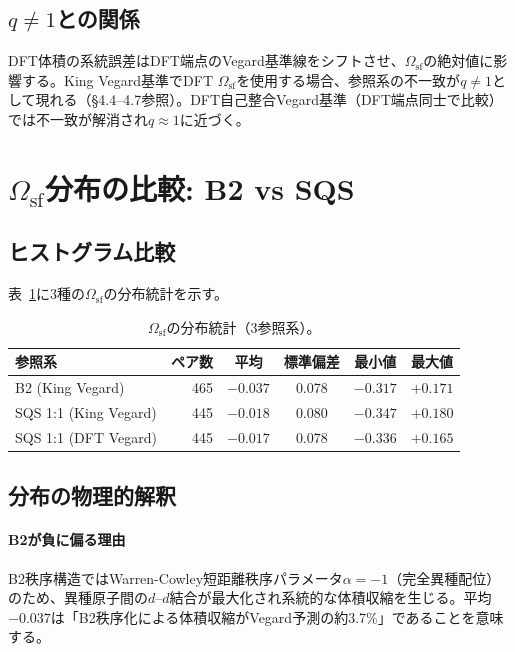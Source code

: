 \documentclass[5p,10pt]{elsarticle}
\begin{document}
\subsection{$q \neq 1$との関係}

DFT体積の系統誤差はDFT端点のVegard基準線をシフトさせ、$\Omega_\text{sf}$の絶対値に影響する。King Vegard基準でDFT $\Omega_\text{sf}$を使用する場合、参照系の不一致が$q \neq 1$として現れる（§4.4--4.7参照）。DFT自己整合Vegard基準（DFT端点同士で比較）では不一致が解消され$q \approx 1$に近づく。


\section{$\Omega_\text{sf}$分布の比較: B2 vs SQS}
\label{sec:appendix_omega_dist}

\subsection{ヒストグラム比較}

表~\ref{tab:omega_stats}に3種の$\Omega_\text{sf}$の分布統計を示す。

\begin{table}[H]
\centering
\caption{$\Omega_\text{sf}$の分布統計（3参照系）。}
\label{tab:omega_stats}
\footnotesize
\begin{tabular}{@{}lrcccc@{}}
\toprule
参照系 & ペア数 & 平均 & 標準偏差 & 最小値 & 最大値 \\
\midrule
B2 (King Vegard) & 465 & $-0.037$ & 0.078 & $-0.317$ & $+0.171$ \\
SQS 1:1 (King Vegard) & 445 & $-0.018$ & 0.080 & $-0.347$ & $+0.180$ \\
SQS 1:1 (DFT Vegard) & 445 & $-0.017$ & 0.078 & $-0.336$ & $+0.165$ \\
\bottomrule
\end{tabular}
\end{table}

\subsection{分布の物理的解釈}

\paragraph{B2が負に偏る理由}
B2秩序構造ではWarren-Cowley短距離秩序パラメータ$\alpha = -1$（完全異種配位）のため、異種原子間の$d$--$d$結合が最大化され系統的な体積収縮を生じる。平均$-0.037$は「B2秩序化による体積収縮がVegard予測の約3.7\%」であることを意味する。
\end{document}
